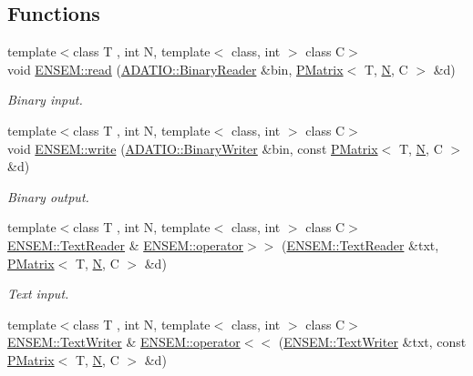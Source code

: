 \subsection*{Functions}
\begin{DoxyCompactItemize}
\item 
{\footnotesize template$<$class T , int N, template$<$ class, int $>$ class C$>$ }\\void \mbox{\hyperlink{group__primmatrix_ga95daf5fb6c2f089f11774d123f8795d5}{E\+N\+S\+E\+M\+::read}} (\mbox{\hyperlink{classADATIO_1_1BinaryReader}{A\+D\+A\+T\+I\+O\+::\+Binary\+Reader}} \&bin, \mbox{\hyperlink{classENSEM_1_1PMatrix}{P\+Matrix}}$<$ T, \mbox{\hyperlink{operator__name__util_8cc_a7722c8ecbb62d99aee7ce68b1752f337}{N}}, C $>$ \&d)
\begin{DoxyCompactList}\small\item\em Binary input. \end{DoxyCompactList}\item 
{\footnotesize template$<$class T , int N, template$<$ class, int $>$ class C$>$ }\\void \mbox{\hyperlink{group__primmatrix_ga7255316b449512a4081c99a02e485e4c}{E\+N\+S\+E\+M\+::write}} (\mbox{\hyperlink{classADATIO_1_1BinaryWriter}{A\+D\+A\+T\+I\+O\+::\+Binary\+Writer}} \&bin, const \mbox{\hyperlink{classENSEM_1_1PMatrix}{P\+Matrix}}$<$ T, \mbox{\hyperlink{operator__name__util_8cc_a7722c8ecbb62d99aee7ce68b1752f337}{N}}, C $>$ \&d)
\begin{DoxyCompactList}\small\item\em Binary output. \end{DoxyCompactList}\item 
{\footnotesize template$<$class T , int N, template$<$ class, int $>$ class C$>$ }\\\mbox{\hyperlink{classENSEM_1_1TextReader}{E\+N\+S\+E\+M\+::\+Text\+Reader}} \& \mbox{\hyperlink{group__primmatrix_ga94a915150324a06d2d330515358811f2}{E\+N\+S\+E\+M\+::operator$>$$>$}} (\mbox{\hyperlink{classENSEM_1_1TextReader}{E\+N\+S\+E\+M\+::\+Text\+Reader}} \&txt, \mbox{\hyperlink{classENSEM_1_1PMatrix}{P\+Matrix}}$<$ T, \mbox{\hyperlink{operator__name__util_8cc_a7722c8ecbb62d99aee7ce68b1752f337}{N}}, C $>$ \&d)
\begin{DoxyCompactList}\small\item\em Text input. \end{DoxyCompactList}\item 
{\footnotesize template$<$class T , int N, template$<$ class, int $>$ class C$>$ }\\\mbox{\hyperlink{classENSEM_1_1TextWriter}{E\+N\+S\+E\+M\+::\+Text\+Writer}} \& \mbox{\hyperlink{group__primmatrix_gafa0f739db2eca6b8b80d632ce81f78b7}{E\+N\+S\+E\+M\+::operator$<$$<$}} (\mbox{\hyperlink{classENSEM_1_1TextWriter}{E\+N\+S\+E\+M\+::\+Text\+Writer}} \&txt, const \mbox{\hyperlink{classENSEM_1_1PMatrix}{P\+Matrix}}$<$ T, \mbox{\hyperlink{operator__name__util_8cc_a7722c8ecbb62d99aee7ce68b1752f337}{N}}, C $>$ \&d)

\end{DoxyCompactItemize}
